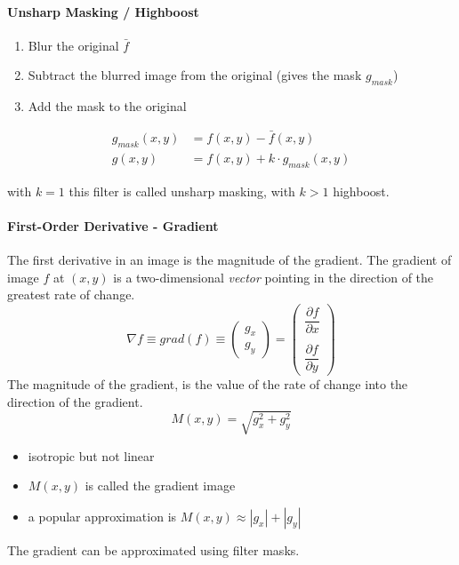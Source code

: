 \paragraph{Unsharp Masking / Highboost}
\begin{enumerate}
\item Blur the original $\bar{f}$
\item Subtract the blurred image from the original (gives the mask $g_{mask}$)
\item Add the mask to the original
\end{enumerate}
\begin{align}
g_{mask}(x,y) &= f(x,y) - \bar{f}(x,y) \\
g(x,y) &= f(x,y) + k \cdot g_{mask}(x,y)
\end{align}

with $k=1$ this filter is called unsharp masking, with $k>1$ highboost.

\paragraph{First-Order Derivative - Gradient}
The first derivative in an image is the magnitude of the gradient.
The gradient of image $f$ at $(x,y)$ is a two-dimensional \emph{vector} pointing in the direction of the greatest rate of change.
\begin{equation}
\nabla f \equiv grad(f) \equiv \begin{pmatrix}g_x\\g_y\end{pmatrix} = \begin{pmatrix} \dfrac{\partial f}{\partial x} \\ \\ \dfrac{\partial f}{\partial y} \end{pmatrix}
\end{equation}
The magnitude of the gradient, is the value of the rate of change into the direction of the gradient.
\begin{equation}
M(x,y) = \sqrt{g_x^2 + g_y^2}
\end{equation}
\begin{itemize}
\item isotropic but not linear
\item $M(x,y)$ is called the gradient image
\item a popular approximation is $M(x,y) \approx |g_x| + |g_y|$
\end{itemize}

The gradient can be approximated using filter masks.


